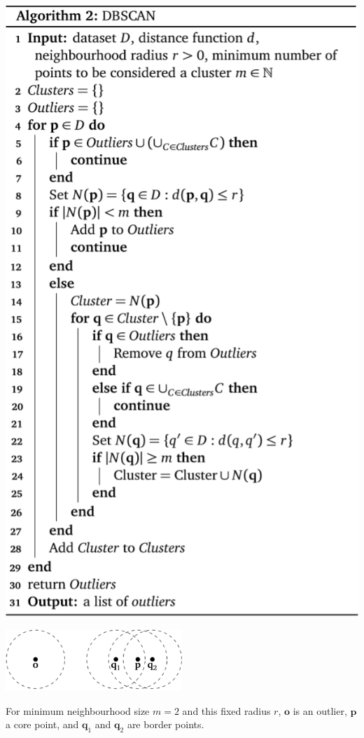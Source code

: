 \documentclass[20pt,landscape,footrule,headrule]{foils}
\begin{document}
\begin{center}\includegraphics[height=\textheight]{Images/Algorithm2}
\end{center}







\begin{center}\includegraphics[width=0.5\textwidth]{Images/Figure13}
\end{center}
{For minimum neighbourhood size $m=2$ and this fixed radius $r$, $\mathbf{o}$ is an outlier, $\mathbf{p}$ a core point, and $\mathbf{q}_1$ and $\mathbf{q}_2$ are border points.}
\end{document}
